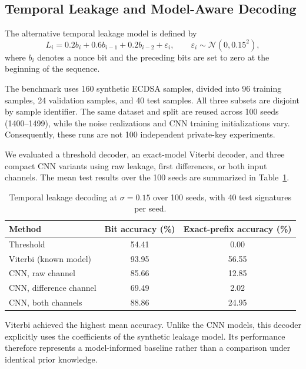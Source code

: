 \documentclass[11pt,a4paper]{article}
\begin{document}
\subsection{Temporal Leakage and Model-Aware Decoding}

The alternative temporal leakage model is defined by
\begin{equation}
    L_i = 0.2b_i + 0.6b_{i-1} + 0.2b_{i-2}
          + \varepsilon_i,
    \qquad
    \varepsilon_i \sim \mathcal{N}(0, 0.15^2),
\end{equation}
where $b_i$ denotes a nonce bit and the preceding bits are set to
zero at the beginning of the sequence.

The benchmark uses 160 synthetic ECDSA samples, divided into
96 training samples, 24 validation samples, and 40 test samples.
All three subsets are disjoint by sample identifier.
The same dataset and split are reused across 100 seeds
(1400--1499), while the noise realizations and CNN training
initializations vary. Consequently, these runs are not
100 independent private-key experiments.

We evaluated a threshold decoder, an exact-model Viterbi decoder,
and three compact CNN variants using raw leakage, first
differences, or both input channels. The mean test results
over the 100 seeds are summarized in
Table~\ref{tab:temporal-comparison}.

\begin{table}[htbp]
\centering
\caption{Temporal leakage decoding at $\sigma=0.15$
over 100 seeds, with 40 test signatures per seed.}
\label{tab:temporal-comparison}
\begin{tabular}{lcc}
\hline
Method & Bit accuracy (\%) & Exact-prefix accuracy (\%) \\
\hline
Threshold & 54.41 & 0.00 \\
Viterbi (known model) & 93.95 & 56.55 \\
CNN, raw channel & 85.66 & 12.85 \\
CNN, difference channel & 69.49 & 2.02 \\
CNN, both channels & 88.86 & 24.95 \\
\hline
\end{tabular}
\end{table}

Viterbi achieved the highest mean accuracy. Unlike the CNN
models, this decoder explicitly uses the coefficients of the
synthetic leakage model. Its performance therefore represents
a model-informed baseline rather than a comparison under
identical prior knowledge.
\end{document}
